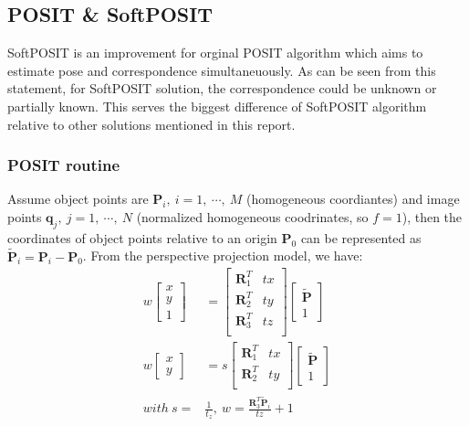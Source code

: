 \documentclass[a4paper]{article}
\begin{document}
\subsection{POSIT \& SoftPOSIT}


SoftPOSIT is an improvement for orginal POSIT algorithm which aims to estimate pose and correspondence simultaneuously. As can be seen from this statement, for SoftPOSIT solution, the correspondence could be unknown or partially known. This serves the biggest difference of SoftPOSIT algorithm relative to other solutions mentioned in this report.
\subsubsection{POSIT routine}
Assume object points are  $\mathbf{P}_i,\ i=1,\ \cdots,\ M$ (homogeneous coordiantes) and image points $\mathbf{q}_j,\ j=1,\ \cdots,\ N$ (normalized homogeneous coodrinates, so $f=1$), then the coordinates of object points relative to an origin $\mathbf{P}_0$ can be represented as $\tilde{\mathbf{P}}_i=\mathbf{P}_i-\mathbf{P}_0$. From the perspective projection model, we have:
\begin{align*}
w\left[
\begin{matrix}
x \\ y \\ 1
\end{matrix}\right]&=\left[
\begin{matrix}
\mathbf{R}_1^T & tx \\ 
\mathbf{R}_2^T & ty \\ 
\mathbf{R}_3^T & tz \\ 
\end{matrix}
\right]
\left[
\begin{matrix}
\tilde{\mathbf{P}} \\ 1
\end{matrix}
\right] \\
w\left[
\begin{matrix}
x \\ y 
\end{matrix}\right]&=s
\left[
\begin{matrix}
\mathbf{R}_1^T & tx \\ 
\mathbf{R}_2^T & ty \\ 
\end{matrix}
\right]
\left[
\begin{matrix}
\tilde{\mathbf{P}} \\ 1
\end{matrix}
\right] \\
with\ s=&\frac{1}{t_z},\ w=\frac{\mathbf{R}_3^T\tilde{\mathbf{P}}_i}{tz}+1
\end{align*}
\end{document}
